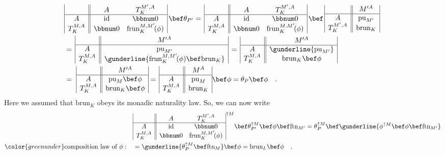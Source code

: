 \begin{align*}
 & \begin{array}{|c||cc|}
 & A & T_{K}^{M^{\prime},A}\\
\hline A & \text{id} & \bbnum 0\\
T_{K}^{M,A} & \bbnum 0 & \text{frun}_{K}^{M,M^{\prime}}\!(\phi)
\end{array}\,\bef\theta_{P^{\prime}}=\,\begin{array}{|c||cc|}
 & A & T_{K}^{M^{\prime},A}\\
\hline A & \text{id} & \bbnum 0\\
T_{K}^{M,A} & \bbnum 0 & \text{frun}_{K}^{M,M^{\prime}}\!(\phi)
\end{array}\,\bef\,\begin{array}{|c||c|}
 & M^{\prime A}\\
\hline A & \text{pu}_{M^{\prime}}\\
T_{K}^{M^{\prime},A} & \text{brun}_{K}
\end{array}\,\\
 & =\,\begin{array}{|c||c|}
 & M^{\prime A}\\
\hline A & \text{pu}_{M^{\prime}}\\
T_{K}^{M,A} & \gunderline{\text{frun}_{K}^{M,M^{\prime}}\!(\phi)\bef\text{brun}_{K}}
\end{array}\,=\,\begin{array}{|c||c|}
 & M^{\prime A}\\
\hline A & \gunderline{\text{pu}_{M^{\prime}}}\\
T_{K}^{M,A} & \text{brun}_{K}\bef\phi
\end{array}\\
 & =\,\,\begin{array}{|c||c|}
 & M^{\prime A}\\
\hline A & \text{pu}_{M}\bef\phi\\
T_{K}^{M,A} & \text{brun}_{K}\bef\phi
\end{array}=\,\begin{array}{|c||c|}
 & M^{A}\\
\hline A & \text{pu}_{M}\\
T_{K}^{M,A} & \text{brun}_{K}
\end{array}\bef\phi=\theta_{P}\bef\phi\quad.
\end{align*}
Here we assumed that $\text{brun}_{K}$ obeys its monadic naturality
law. So, we can now write
\begin{align*}
 & \begin{array}{|c||cc|}
 & A & T_{K}^{M^{\prime},A}\\
\hline A & \text{id} & \bbnum 0\\
T_{K}^{M,A} & \bbnum 0 & \text{frun}_{K}^{M,M^{\prime}}\!(\phi)
\end{array}^{\uparrow M}\bef\theta_{P^{\prime}}^{\uparrow M}\bef\phi\bef\text{ftn}_{M^{\prime}}=\theta_{P}^{\uparrow M}\bef\gunderline{\phi^{\uparrow M}\bef\phi\bef\text{ftn}_{M^{\prime}}}\\
{\color{greenunder}\text{composition law of }\phi:}\quad & =\gunderline{\theta_{P}^{\uparrow M}\bef\text{ftn}_{M}}\bef\phi=\text{brun}_{L}\bef\phi\quad.
\end{align*}


